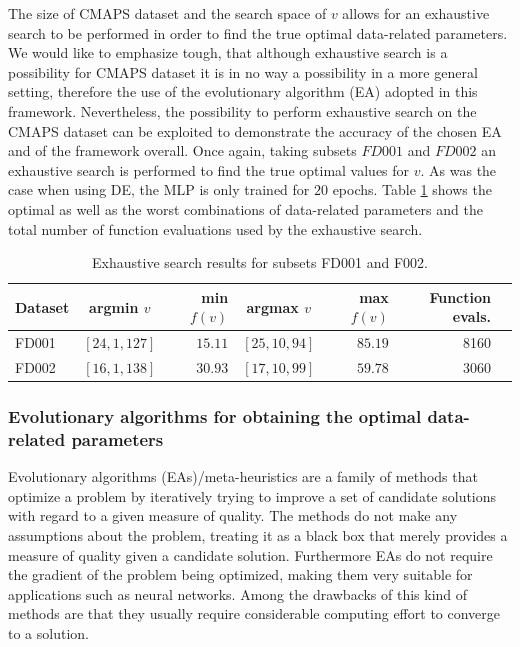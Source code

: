\documentclass{article}
\begin{document}
The size of CMAPS dataset and the search space of $v$ allows for an exhaustive search to be performed in order to find the true optimal data-related parameters. We would like to emphasize tough, that although exhaustive search is a possibility for CMAPS dataset it is in no way a possibility in a more general setting, therefore the use of the evolutionary algorithm (EA) adopted in this framework. Nevertheless, the possibility to perform exhaustive search on the CMAPS dataset can be exploited to demonstrate the accuracy of the chosen EA and of the framework overall. Once again, taking subsets $FD001$ and $FD002$ an exhaustive search is performed to find the true optimal values for $v$. As was the case when using DE, the MLP is only trained for $20$ epochs. Table \ref{table:true_optimal_data_params} shows the optimal as well as the worst combinations of data-related parameters and the total number of function evaluations used by the exhaustive search.

\begin{table}[!htb]
\centering
\begin{tabular}{l | c r c r r l}
	\hline
	 Dataset & argmin $v$ & min $f(v)$ & argmax $v$ & max $f(v)$ & Function evals.\\
  	\hline
  	FD001 & $\left[ 24, 1, 127 \right]$ & $15.11$ & $\left[ 25, 10, 94 \right]$ & $85.19$ & 8160\\
  	FD002 & $\left[ 16, 1, 138 \right]$ & $30.93$ & $\left[ 17, 10, 99 \right]$ & $59.78$ & 3060\\
  	\hline
\end{tabular}
\caption{Exhaustive search results for subsets FD001 and F002.}
\label{table:true_optimal_data_params}
\end{table}

\subsubsection{Evolutionary algorithms for obtaining the optimal data-related parameters}
\label{sec:ea_optimization_process}

Evolutionary algorithms (EAs)/meta-heuristics are a family of methods that optimize a problem by iteratively trying to improve a set of candidate solutions with regard to a given measure of quality. The methods do not make any assumptions about the problem, treating it as a black box that merely provides a measure of quality given a candidate solution. Furthermore EAs do not require the gradient of the problem being optimized, making them very suitable for applications such as neural networks. Among the drawbacks of this kind of methods are that they usually require considerable computing effort to converge to a solution.
\end{document}
